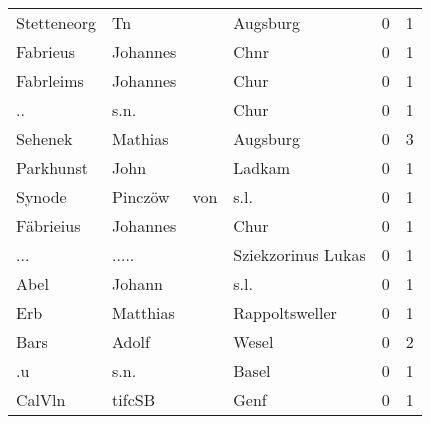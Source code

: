 \begin{center}
\begin{tiny}
\begin{longtabu}{llllrr}
              Stetteneorg &                                 Tn &             &                                    Augsburg &          0 &         1 \\
                 Fabrieus &                           Johannes &             &                                        Chnr &          0 &         1 \\
                Fabrleims &                           Johannes &             &                                        Chur &          0 &         1 \\
                       .. &                               s.n. &             &                                        Chur &          0 &         1 \\
                  Sehenek &                            Mathias &             &                                    Augsburg &          0 &         3 \\
                Parkhunst &                               John &             &                                      Ladkam &          0 &         1 \\
                   Synode &                            Pinczöw &         von &                                        s.l. &          0 &         1 \\
                Fäbrieius &                           Johannes &             &                                        Chur &          0 &         1 \\
                      ... &                              ..... &             &                          Sziekzorinus Lukas &          0 &         1 \\
                     Abel &                             Johann &             &                                        s.l. &          0 &         1 \\
                      Erb &                           Matthias &             &                              Rappoltsweller &          0 &         1 \\
                     Bars &                              Adolf &             &                                       Wesel &          0 &         2 \\
                       .u &                               s.n. &             &                                       Basel &          0 &         1 \\
                   CalVln &                             tifcSB &             &                                        Genf &          0 &         1 \\

\end{longtabu}
\end{tiny}
\end{center}
